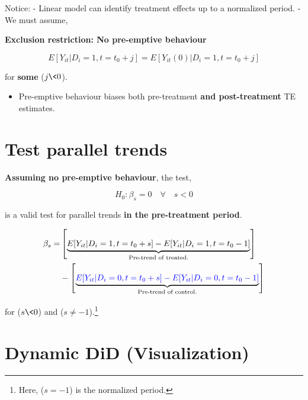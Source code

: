 \documentclass[
  letterpaper,
  DIV=11,
  numbers=noendperiod]{scrreprt}
\providecommand{\tightlist}{%
  \setlength{\itemsep}{0pt}\setlength{\parskip}{0pt}}\usepackage{longtable,booktabs,array}
\theoremstyle{definition}
\theoremstyle{remark}
\begin{document}
Notice: - Linear model can identify treatment effects up to a normalized
period. - We must assume,

\begin{tcolorbox}[enhanced jigsaw, breakable, colframe=quarto-callout-note-color-frame, toptitle=1mm, toprule=.15mm, opacitybacktitle=0.6, opacityback=0, rightrule=.15mm, titlerule=0mm, colback=white, bottomtitle=1mm, title={Note}, arc=.35mm, coltitle=black, colbacktitle=quarto-callout-note-color!10!white, leftrule=.75mm, bottomrule=.15mm, left=2mm]

\textbf{Exclusion restriction: No pre-emptive behaviour}

\[
E[Y_{it}|D_i = 1, t = t_0 + j] = E[Y_{it}(0)|D_i = 1, t = t_0 + j]
\]

for \textbf{some} (\(j \< 0\)).

\end{tcolorbox}

\begin{itemize}
\tightlist
\item
  Pre-emptive behaviour biases both pre-treatment \textbf{and
  post-treatment} TE estimates.
\end{itemize}

\hypertarget{test-parallel-trends}{%
\section{Test parallel trends}\label{test-parallel-trends}}

\textbf{Assuming no pre-emptive behaviour}, the test,

\[
H_0: \beta_s = 0 \quad \forall \quad s < 0
\]

is a valid test for parallel trends \textbf{in the pre-treatment
period}.

\[
\begin{aligned}
\beta_s = & \left[\underbrace{E[Y_{it}|D_i = 1, t = t_0 + s] - E[Y_{it}|D_i = 1, t = t_0 - 1]}_{\text{Pre-trend of treated.}}\right] \\
& - \left[\underbrace{\textcolor{blue}{E[Y_{it}|D_i = 0, t = t_0 + s] - E[Y_{it}|D_i = 0, t = t_0 - 1]}}_{\text{Pre-trend of control.}}\right]
\end{aligned}
\]

for (\(s \< 0\)) and (\(s \neq -1\)).\footnote{Here, (\(s=-1\)) is the
  normalized period.}

\hypertarget{dynamic-did-visualization}{%
\section{Dynamic DiD (Visualization)}\label{dynamic-did-visualization}}
\end{document}
